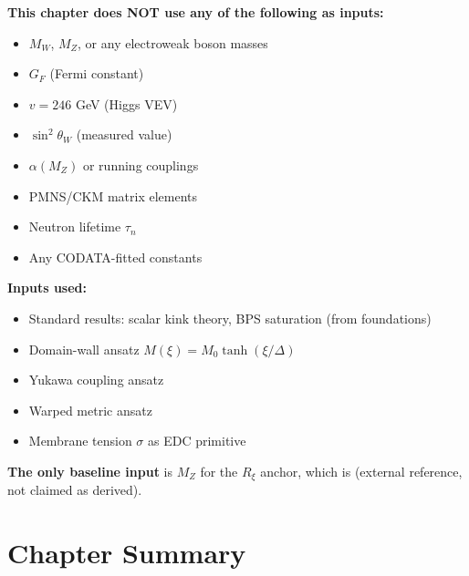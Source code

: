 \begin{tcolorbox}[colback=red!5!white, colframe=red!50!black,
    title=\textbf{No-Smuggling Certification (Chapter 13)}]
\textbf{This chapter does NOT use any of the following as inputs:}
\begin{itemize}[nosep]
    \item[$\times$] $M_W$, $M_Z$, or any electroweak boson masses
    \item[$\times$] $G_F$ (Fermi constant)
    \item[$\times$] $v = 246$ GeV (Higgs VEV)
    \item[$\times$] $\sin^2\theta_W$ (measured value)
    \item[$\times$] $\alpha(M_Z)$ or running couplings
    \item[$\times$] PMNS/CKM matrix elements
    \item[$\times$] Neutron lifetime $\tau_n$
    \item[$\times$] Any CODATA-fitted constants
\end{itemize}

\textbf{Inputs used:}
\begin{itemize}[nosep]
    \item[$\checkmark$] Standard results: scalar kink theory, BPS saturation \tagDer{} (from \tagM{} foundations)
    \item[$\checkmark$] Domain-wall ansatz $M(\xi) = M_0 \tanh(\xi/\Delta)$ \tagP{}
    \item[$\checkmark$] Yukawa coupling ansatz \tagP{}
    \item[$\checkmark$] Warped metric ansatz \tagP{}
    \item[$\checkmark$] Membrane tension $\sigma$ as EDC primitive \tagP{}
\end{itemize}

\textbf{The only baseline input} is $M_Z$ for the $R_\xi$ anchor, which is \tagBL{}
(external reference, not claimed as derived).
\end{tcolorbox}

\section{Chapter Summary}
\label{sec:ch13_summary}

